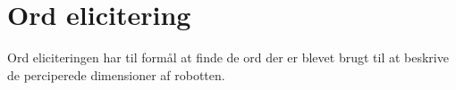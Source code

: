 \section*{Ord elicitering}
\label{OrdElicitering}

Ord eliciteringen har til formål at finde de ord der er blevet brugt til at beskrive de perciperede dimensioner af robotten. 
